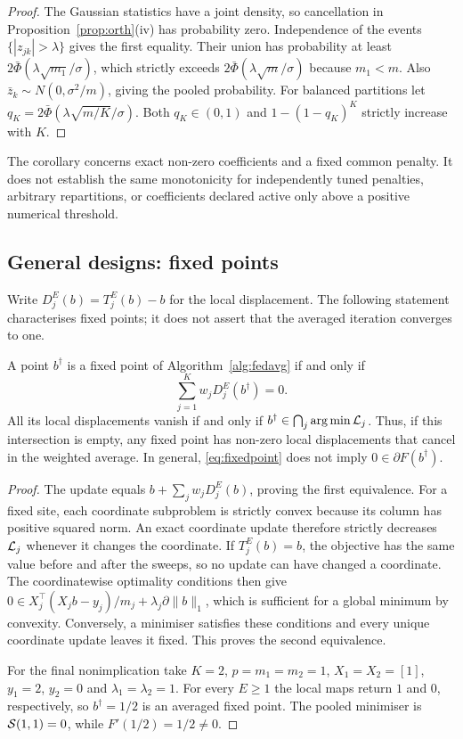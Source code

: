 \begin{proof}
The Gaussian statistics have a joint density, so cancellation in
Proposition~\ref{prop:orth}(iv) has probability zero. Independence of the
events $\{|z_{jk}|>\lambda\}$ gives the first equality. Their union has
probability at least $2\bar\Phi(\lambda\sqrt{m_1}/\sigma)$, which strictly
exceeds $2\bar\Phi(\lambda\sqrt m/\sigma)$ because $m_1<m$.
Also $\bar z_k\sim N(0,\sigma^2/m)$, giving the pooled probability.
For balanced partitions let $q_K=2\bar\Phi(\lambda\sqrt{m/K}/\sigma)$.
Both $q_K\in(0,1)$ and $1-(1-q_K)^K$ strictly increase with $K$.
\end{proof}

The corollary concerns exact non-zero coefficients and a fixed common
penalty. It does not establish the same monotonicity for independently
tuned penalties, arbitrary repartitions, or coefficients declared active
only above a positive numerical threshold.

\subsection{General designs: fixed points}

Write $D_j^E(b)=T_j^E(b)-b$ for the local displacement. The following
statement characterises fixed points; it does not assert that the
averaged iteration converges to one.

\begin{proposition}
\label{prop:fixed}
A point $b^\dagger$ is a fixed point of Algorithm~\ref{alg:fedavg} if and
only if
\begin{equation}
 \sum_{j=1}^K w_jD_j^E(b^\dagger)=0.
 \label{eq:fixedpoint}
\end{equation}
All its local displacements vanish if and only if
$b^\dagger\in\bigcap_j\arg\min\mathcal{L}_j$.
Thus, if this intersection is empty, any fixed point has non-zero local
displacements that cancel in the weighted average. In general,
\eqref{eq:fixedpoint} does not imply $0\in\partial F(b^\dagger)$.
\end{proposition}

\begin{proof}
The update equals $b+\sum_jw_jD_j^E(b)$, proving the first equivalence.
For a fixed site, each coordinate subproblem is strictly convex because
its column has positive squared norm. An exact coordinate update
therefore strictly decreases $\mathcal{L}_j$ whenever it changes the coordinate.
If $T_j^E(b)=b$, the objective has the same value before and after the
sweeps, so no update can have changed a coordinate. The coordinatewise
optimality conditions then give
$0\in X_j^\top(X_jb-y_j)/m_j+\lambda_j\partial\|b\|_1$,
which is sufficient for a global minimum by convexity. Conversely, a
minimiser satisfies these conditions and every unique coordinate update
leaves it fixed. This proves the second equivalence.

For the final nonimplication take $K=2$, $p=m_1=m_2=1$,
$X_1=X_2=[1]$, $y_1=2$, $y_2=0$ and $\lambda_1=\lambda_2=1$.
For every $E\ge1$ the local maps return $1$ and $0$, respectively, so
$b^\dagger=1/2$ is an averaged fixed point. The pooled minimiser is
$\mathcal{S}(1,1)=0$, while $F'(1/2)=1/2\ne0$.
\end{proof}

